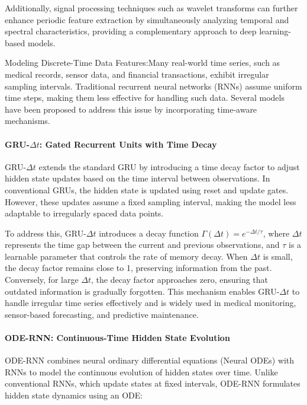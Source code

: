 \documentclass[acmsmall]{acmart}
\begin{document}
Additionally, signal processing techniques such as wavelet transforms can further enhance periodic feature extraction by simultaneously analyzing temporal and spectral characteristics, providing a complementary approach to deep learning-based models.

Modeling Discrete-Time Data Features:Many real-world time series, such as medical records, sensor data, and financial transactions, exhibit irregular sampling intervals. Traditional recurrent neural networks (RNNs) assume uniform time steps, making them less effective for handling such data. Several models have been proposed to address this issue by incorporating time-aware mechanisms.

\paragraph{GRU-$\Delta t$: Gated Recurrent Units with Time Decay} GRU-$\Delta t$ \cite{metzger2023crop} extends the standard GRU by introducing a time decay factor to adjust hidden state updates based on the time interval between observations. In conventional GRUs, the hidden state is updated using reset and update gates. However, these updates assume a fixed sampling interval, making the model less adaptable to irregularly spaced data points.

To address this, GRU-$\Delta t$ introduces a decay function $\Gamma(\Delta t) = e^{-\Delta t / \tau}$, where $\Delta t$ represents the time gap between the current and previous observations, and $\tau$ is a learnable parameter that controls the rate of memory decay. When $\Delta t$ is small, the decay factor remains close to 1, preserving information from the past. Conversely, for large $\Delta t$, the decay factor approaches zero, ensuring that outdated information is gradually forgotten. This mechanism enables GRU-$\Delta t$ to handle irregular time series effectively and is widely used in medical monitoring, sensor-based forecasting, and predictive maintenance.

\paragraph{ODE-RNN: Continuous-Time Hidden State Evolution}ODE-RNN \cite{rubanova2019latent} combines neural ordinary differential equations (Neural ODEs) \cite{chen2018neural} with RNNs to model the continuous evolution of hidden states over time. Unlike conventional RNNs, which update states at fixed intervals, ODE-RNN formulates hidden state dynamics using an ODE:
\end{document}
